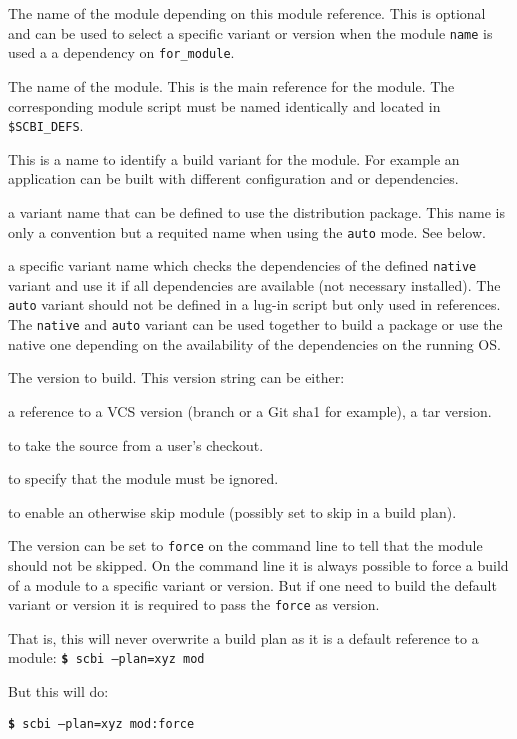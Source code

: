 \documentclass[a4paper,12pt,twoside]{article}
\newcommand{\code}[1]{\texttt{#1}}
\newcommand{\cmd}[1]{\tabto{1cm}\hspace{0.5cm}\texttt{\textbf{\$} #1}}
\begin{document}
\begin{description}[style=nextline]
	\item[for\_module] The name of the module depending on this module reference. This is optional and can be used to select a specific variant or version when the module \code{name} is used a a dependency on \code{for\_module}.

	\item[name] The name of the module. This is the main reference for the module. The corresponding module script must be named identically and located in \code{\$SCBI\_DEFS}.

	\item[variant] \label{variant}This is a name to identify a build variant for the module. For example an application can be built with different configuration and or dependencies.

	\begin{description}[font=\texttt]
		\item[native] a variant name that can be defined to use the distribution package. This name is only a convention but a requited name when using the \code{auto} mode. See below.
		\item[auto] a specific variant name which checks the dependencies of the defined \code{native} variant and use it if all dependencies are available (not necessary installed). The \code{auto} variant should not be defined in a lug-in script but only used in references. The \code{native} and \code{auto} variant can be used together to build a package or use the native one depending on the availability of the dependencies on the running OS.
	\end{description}

	\item[version] The version to build. This version string can be either:

	\begin{description}[font=\texttt]
		\item[<VCS>] a reference to a VCS version (branch or a Git sha1 for example), a tar version.
		\item[dev] to take the source from a user's checkout.
		\item[kip] to specify that the module must be ignored.
		\item[force] to enable an otherwise skip module (possibly set to skip in a build plan).
	\end{description}

	The version can be set to \code{force} on the command line to tell that the module should not be skipped. On the command line it is always possible to force a build of a module to a specific variant or version. But if one need to build the default variant or version it is required to pass the \code{force} as version.

	That is, this will never overwrite a build plan as it is a default reference to a module:
	\cmd{scbi --plan=xyz mod}

	But this will do:

	\cmd{scbi --plan=xyz mod:force}
\end{description}
\end{document}
